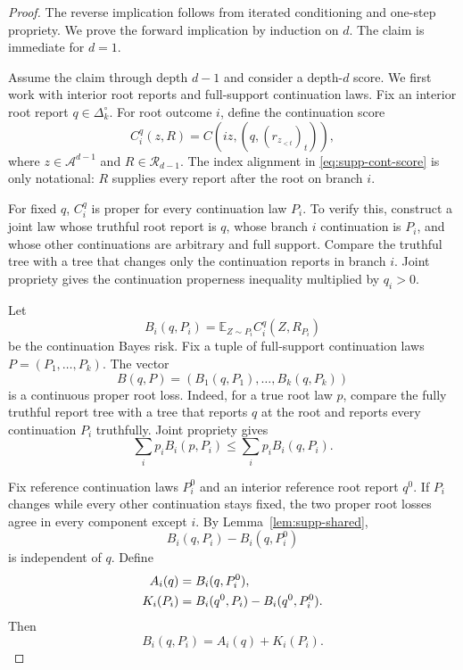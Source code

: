 \documentclass[twoside]{article}
\newcommand{\E}{\mathbb E}
\newcommand{\cA}{\mathcal A}
\newcommand{\cR}{\mathcal R}
\newcommand{\1}{\mathbf 1}
\begin{document}
\begin{proof}
The reverse implication follows from iterated conditioning and one-step
propriety. We prove the forward implication by induction on $d$. The claim is
immediate for $d=1$.

Assume the claim through depth $d-1$ and consider a depth-$d$ score. We first
work with interior root reports and full-support continuation laws. Fix an
interior root report $q\in\Delta_k^\circ$. For root outcome $i$, define the
continuation score
\begin{equation}
 C_i^q(z,R)=C(iz,(q,(r_{z_{<t}})_t)),
 \label{eq:supp-cont-score}
\end{equation}
where $z\in\cA^{d-1}$ and $R\in\cR_{d-1}$. The index alignment in
\eqref{eq:supp-cont-score} is only notational: $R$ supplies every report after
the root on branch $i$.

For fixed $q$, $C_i^q$ is proper for every continuation law $P_i$. To verify
this, construct a joint law whose truthful root report is $q$, whose branch
$i$ continuation is $P_i$, and whose other continuations are arbitrary and
full support. Compare the truthful tree with a tree that changes only the
continuation reports in branch $i$. Joint propriety gives the continuation
properness inequality multiplied by $q_i>0$.

Let
\begin{equation}
 B_i(q,P_i)=\E_{Z\sim P_i}C_i^q(Z,R_{P_i})
 \label{eq:supp-branch-bayes}
\end{equation}
be the continuation Bayes risk. Fix a tuple of full-support continuation laws
$P=(P_1,\ldots,P_k)$. The vector
\begin{equation*}
 B(q,P)=(B_1(q,P_1),\ldots,B_k(q,P_k))
\end{equation*}
is a continuous proper root loss. Indeed, for a true root law $p$, compare
the fully truthful report tree with a tree that reports $q$ at the root and
reports every continuation $P_i$ truthfully. Joint propriety gives
\begin{equation*}
 \sum_i p_iB_i(p,P_i)\leq\sum_i p_iB_i(q,P_i).
\end{equation*}

Fix reference continuation laws $P_i^0$ and an interior reference root report
$q^0$. If $P_i$ changes while every other continuation stays fixed, the two
proper root losses agree in every component except $i$. By
Lemma~\ref{lem:supp-shared},
\begin{equation*}
 B_i(q,P_i)-B_i(q,P_i^0)
\end{equation*}
is independent of $q$. Define
\begin{align}
 A_i(q)&=B_i(q,P_i^0),\notag\\
 K_i(P_i)&=B_i(q^0,P_i)-B_i(q^0,P_i^0).
 \label{eq:supp-AK}
\end{align}
Then
\begin{equation}
 B_i(q,P_i)=A_i(q)+K_i(P_i).
 \label{eq:supp-bayes-separate}
\end{equation}


\end{proof}
\end{document}
